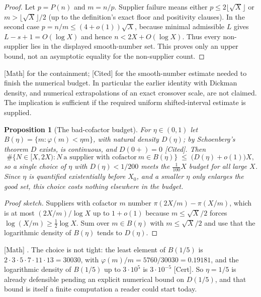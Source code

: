 \documentclass[11pt]{article}
\theoremstyle{plain}
\newtheorem{prop}[thm]{Proposition}
\theoremstyle{definition}
\theoremstyle{remark}
\newcommand{\ev}[1]{{\small\textsf{[#1]}}\xspace}
\newcommand{\scale}[1]{{\small\textsf{scale:#1}}\xspace}
\begin{document}
\begin{proof}
Let $p=P(n)$ and $m=n/p$.  Supplier failure means either
$p\le2\lfloor\sqrt X\rfloor$ or $m>\lfloor\sqrt X\rfloor/2$ (up to the
definition's exact floor and positivity clauses).  In the second case
$p=n/m\le(4+o(1))\sqrt X$, because minimal admissible $L$ gives
$L-s+1=O(\log X)$ and hence $n<2X+O(\log X)$.  Thus every non-supplier lies in
the displayed smooth-number set.  This proves only an upper bound, not an
asymptotic equality for the non-supplier count.
\end{proof}

\noindent
\ev{Math} for the containment; \ev{Cited} for the smooth-number estimate
needed to finish the numerical budget.  In particular the earlier identity
with Dickman density, and numerical extrapolations of an exact crossover
scale, are not claimed.  The implication is sufficient if the required
uniform shifted-interval estimate is supplied.

\begin{prop}[The bad-cofactor budget]\label{prop:badcof}
For $\eta\in(0,1)$ let $B(\eta)=\{m:\varphi(m)<\eta m\}$, with natural density
$D(\eta)$; by Schoenberg's theorem $D$ exists, is continuous, and
$D(0+)=0$ \ev{Cited}. Then
\[
  \#\{N\in[X,2X): N\ \text{a supplier with cofactor}\ m\in B(\eta)\}
  \;\le\;\bigl(D(\eta)+o(1)\bigr)X ,
\]
so a single choice of $\eta$ with $D(\eta)<1/200$ meets the $\tfrac{1}{100}X$
budget for all large $X$. Since $\eta$ is quantified existentially before
$X_0$, and a smaller $\eta$ only enlarges the good set, this choice costs
nothing elsewhere in the budget.
\end{prop}

\begin{proof}[Proof sketch]
Suppliers with cofactor $m$ number $\pi(2X/m)-\pi(X/m)$, which is at most
$(2X/m)/\log X$ up to $1+o(1)$ because $m\le\sqrt X/2$ forces
$\log(X/m)\ge\tfrac12\log X$. Sum over $m\in B(\eta)$ with $m\le\sqrt X/2$
and use that the logarithmic density of $B(\eta)$ tends to $D(\eta)$.
\end{proof}

\noindent
\ev{Math} \quad \scale{cofinal}. The choice is not tight: the least element
of $B(1/5)$ is $2\cdot3\cdot5\cdot7\cdot11\cdot13=30030$, with
$\varphi(m)/m=5760/30030=0.19181$, and the logarithmic density of $B(1/5)$ up
to $3\cdot10^{5}$ is $3\cdot 10^{-5}$ \ev{Cert}. So $\eta=1/5$ is already
defensible pending an explicit numerical bound on $D(1/5)$, and that bound is
itself a finite computation a reader could start today.
\end{document}

